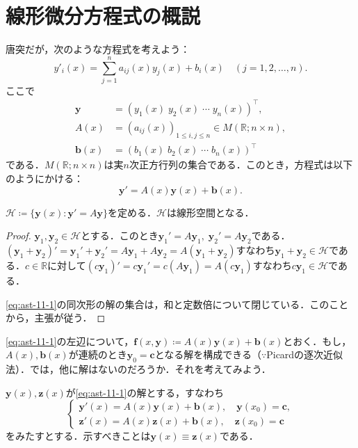 \section{線形微分方程式の概説}
唐突だが，次のような方程式を考えよう：
\begin{equation}
    y'_i(x) = \sum_{j=1}^{n} a_{ij}(x)y_j(x) + b_i(x) \quad (j=1,2,\ldots,n).
\end{equation}
ここで
\begin{align*}
    \bm{y} &= (y_1(x) \; y_2(x) \; \cdots \; y_n(x))^\top, \\
    A(x) &= (a_{ij}(x))_{1\leq i,j \leq n} \in M(\mathbb{R};n\times n), \\
    \bm{b}(x) &= (b_1(x) \; b_2(x) \; \cdots \; b_n(x))^\top
\end{align*}
である．$M(\mathbb{R};n\times n)$は実$n$次正方行列の集合である．このとき，方程式は以下のようにかける：
\begin{equation}
    \bm{y}' = A(x)\bm{y}(x) + \bm{b}(x). \label{eq:ast-11-1}
\end{equation}

\begin{claim*}
    $\mathscr{H} \coloneqq \{\bm{y}(x) : \bm{y}'=A\bm{y}\}$を定める．$\mathscr{H}$は線形空間となる．
\end{claim*}
\begin{proof}
    $\bm{y}_1, \bm{y}_2 \in \mathscr{H}$とする．このとき$\bm{y}_1'=A\bm{y}_1, \; \bm{y}_2'=A\bm{y}_2$である．$(\bm{y}_1+\bm{y}_2)'=\bm{y}_1'+\bm{y}_2'=A\bm{y}_1+A\bm{y}_2=A(\bm{y}_1+\bm{y}_2)$すなわち$\bm{y}_1+\bm{y}_2 \in \mathscr{H}$である．$c \in \mathbb{R}$に対して$(c\bm{y}_1)' = c \bm{y}_1' = c(A\bm{y}_1) = A(c\bm{y}_1)$すなわち$c\bm{y}_1 \in \mathscr{H}$である．

    \eqref{eq:ast-11-1}の同次形の解の集合は，和と定数倍について閉じている．このことから，主張が従う．
\end{proof}

\eqref{eq:ast-11-1}の左辺について，$\bm{f}(x,\bm{y}) \coloneqq A(x)\bm{y}(x) + \bm{b}(x)$とおく．もし，$A(x), \bm{b}(x)$が連続のとき$\bm{y}_0=\bm{c}$となる解を構成できる（$\because$Picardの逐次近似法）．では，他に解はないのだろうか．それを考えてみよう．

$\bm{y}(x), \bm{z}(x)$が\eqref{eq:ast-11-1}の解とする，すなわち
\begin{equation}
    \begin{cases}
        \bm{y}'(x) = A(x)\bm{y}(x) + \bm{b}(x), \quad \bm{y}(x_0) = \bm{c}, \\
        \bm{z}'(x) = A(x)\bm{z}(x) + \bm{b}(x), \quad \bm{z}(x_0) = \bm{c}
    \end{cases}
\end{equation}
をみたすとする．示すべきことは$\bm{y}(x) \equiv \bm{z}(x)$である．

